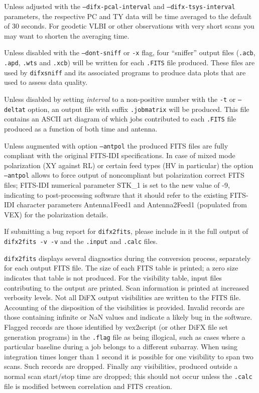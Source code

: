 Unless adjusted with the {\tt --difx-pcal-interval} and {\tt --difx-tsys-interval} parameters, the respective PC and TY data will be time averaged to the default of 30 seconds. For geodetic
VLBI or other observations with very short scans you may want to shorten the averaging time.

Unless disabled with the {\tt --dont-sniff} or {\tt -x} flag, four ``sniffer'' output files ({\tt .acb}, {\tt .apd}, {\tt .wts} and {\tt .xcb}) will be written for each {\tt .FITS} file produced.  
These files are used by {\tt difxsniff} and its associated programs to produce data plots that are used to assess data quality.

Unless disabled by setting {\em interval} to a non-positive number with the {\tt -t} or {\tt --deltat} option, an output file with suffix {\tt .jobmatrix} will be produced. 
This file contains an ASCII art diagram of which jobs contributed to each {\tt .FITS} file produced as a function of both time and antenna.

Unless augmented with option {\tt --antpol} the produced FITS files are fully compliant with the original FITS-IDI specifications. In case of mixed mode polarization (XY against RL)
or certain feed types (HV in particular) the option {\tt --antpol} allows to force output of noncompliant but polarization correct FITS files; FITS-IDI numerical parameter STK\_1 is set to
the new value of -9, indicating to post-processing software that it should refer to the existing FITS-IDI character parameters Antenna1Feed1 and Antenna2Feed1 (populated from VEX)
for the polarization details.

If submitting a bug report for {\tt difx2fits}, please include in it the full output of {\tt difx2fits -v -v} and the {\tt .input} and {\tt .calc} files.

{\tt difx2fits} displays several diagnostics during the conversion process, separately for each output FITS file.
The size of each FITS table is printed; a zero size indicates that table is not produced.
For the visibility table, input files contributing to the output are printed.
Scan information is printed at increased verbosity levels.
Not all DiFX output visibilities are written to the FITS file.
Accounting of the disposition of the visibilities is provided.
Invalid records are those containing infinite or NaN values and indicate a likely bug in the software.
Flagged records are those identified by vex2script (or other DiFX file set generation programs) in the {\tt .flag} file as being illogical, such as cases where a particular baseline during a job belongs to a different subarray.
When using integration times longer than 1 second it is possible for one visibility to span two scans.  
Such records are dropped.
Finally any visibilities, produced outside a normal scan start/stop time are dropped; this should not occur unless the {\tt .calc} file is modified between correlation and FITS creation.

